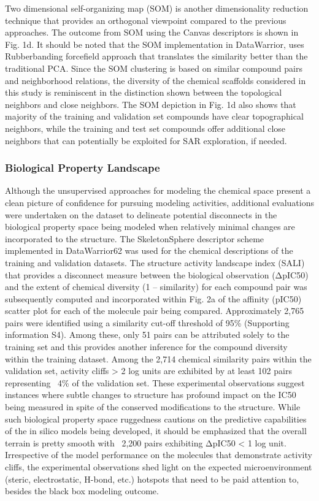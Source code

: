 Two dimensional self-organizing map (SOM) is another dimensionality reduction technique that provides an orthogonal viewpoint compared to the previous approaches. The outcome from SOM using the Canvas descriptors is shown in Fig. 1d.  It should be noted that the SOM implementation in DataWarrior, uses Rubberbanding forcefield approach that translates the similarity better than the traditional PCA.  Since the SOM clustering is based on similar compound pairs and neighborhood relations, the diversity of the chemical scaffolds considered in this study is reminiscent in the distinction shown between the topological neighbors and close neighbors.  The SOM depiction in Fig. 1d also shows that majority of the training and validation set compounds have clear topographical neighbors, while the training and test set compounds offer additional close neighbors that can potentially be exploited for SAR exploration, if needed. 

\subsubsection{Biological Property Landscape}

Although the unsupervised approaches for modeling the chemical space present a clean picture of confidence for pursuing modeling activities, additional evaluations were undertaken on the dataset to delineate potential disconnects in the biological property space being modeled when relatively minimal changes are incorporated to the structure.  The SkeletonSphere descriptor scheme implemented in DataWarrior62 was used for the chemical descriptions of the training and validation datasets. The structure activity landscape index (SALI) that provides a disconnect measure between the biological observation (ΔpIC50) and the extent of chemical diversity (1 – similarity) for each compound pair was subsequently computed and incorporated within Fig. 2a of the affinity (pIC50) scatter plot for each of the molecule pair being compared.  Approximately 2,765 pairs were identified using a similarity cut-off threshold of 95\% (Supporting information S4).  Among these, only 51 pairs can be attributed solely to the training set and this provides another inference for the compound diversity within the training dataset.  Among the 2,714 chemical similarity pairs within the validation set, activity cliffs > 2 log units are exhibited by at least 102 pairs representing ~4\% of the validation set.  These experimental observations suggest instances where subtle changes to structure has profound impact on the IC50 being measured in spite of the conserved modifications to the structure.  While such biological property space ruggedness cautions on the predictive capabilities of the in silico models being developed, it should be emphasized that the overall terrain is pretty smooth with ~2,200 pairs exhibiting ΔpIC50 < 1 log unit.  Irrespective of the model performance on the molecules that demonstrate activity cliffs, the experimental observations shed light on the expected microenvironment (steric, electrostatic, H-bond, etc.) hotspots that need to be paid attention to, besides the black box modeling outcome.  

